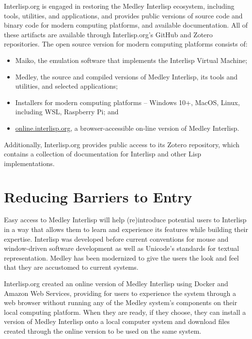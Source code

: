 \documentclass[sigconf]{acmart}
\begin{document}
Interlisp.org is engaged in restoring the Medley Interlisp ecosystem, including tools, utilities, and applications, and provides public versions of source code and binary code for modern computing platforms, and available documentation. All of these artifacts are available through Interlisp.org's GitHub and Zotero repositories. The open source version for modern computing platforms consists of:

\begin{itemize}
  \item Maiko, the emulation software that implements the Interlisp Virtual Machine;

  \item Medley, the source and compiled versions of Medley Interlisp, its tools and utilities, and selected applications; 

  \item Installers for modern computing platforms – Windows 10+, MacOS, Linux, including WSL, Raspberry Pi; and

  \item \url{online.interlisp.org}, a browser-accessible on-line version of Medley Interlisp.
\end{itemize}

Additionally, Interlisp.org provides public access to its Zotero repository, which contains a collection of documentation for Interlisp and other Lisp implementations.

\section{Reducing Barriers to Entry}

Easy access to Medley Interlisp will help (re)introduce potential users to Interlisp in a way that allows them to learn and experience its features while building their expertise. Interlisp was developed before current conventions for mouse and window-driven software development as well as Unicode's standards for textual representation. Medley has been modernized to give the users the look and feel that they are accustomed to current systems.

Interlisp.org created an online version of Medley Interlisp using Docker and Amazon Web Services, providing for users to experience the system through a web browser without running any of the Medley system's components on their local computing platform. When they are ready, if they choose, they can install a version of Medley Interlisp onto a local computer system and download files created through the online version to be used on the same system.
\end{document}
